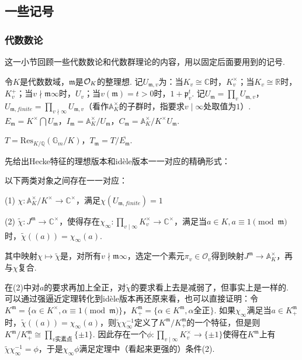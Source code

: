 \subsection{一些记号}

\subsubsection{代数数论}

这一小节回顾一些代数数论和代数群理论的内容，用以固定后面要用到的记号.

令$K$是代数数域，$\mathfrak{m}$是$\mathcal{O}_K$的整理想. 记$U_{\mathfrak{m}, v}$为：当$K_v \cong \mathbb{C}$时，$K_v^{\times}$；当$K_v\cong \mathbb{R}$时，$K_v^{+}$；当$v\nmid\mathfrak{m}\infty$时，$U_{v}$；当$v(\mathfrak{m})=t>0$时，$1+\mathfrak{p}_v^{t}$. 记$U_{\mathfrak{m}}=\prod_v U_{\mathfrak{m}, v}$，$U_{\mathfrak{m}, finite} = \prod_{v\nmid \infty}U_{\mathfrak{m}, v}$（看作$\mathbb{A}_K^{\times}$的子群时，指要求$v\mid \infty$处取值为$1$）. $E_{\mathfrak{m}} = K^{\times} \bigcap U_{\mathfrak{m}}$，$I_{\mathfrak{m}} = \mathbb{A}_K^{\times}/U_{\mathfrak{m}}$，$C_{\mathfrak{m}} = \mathbb{A}_K^{\times} / K^{\times}U_{\mathfrak{m}}$.

$T = \mathrm{Res}_{K/\mathbb{Q}}(\mathbb{G}_m/K)$，$T_{\mathfrak{m}} = T / \overline{E_{\mathfrak{m}}}$.

先给出Hecke特征的理想版本和idèle版本一一对应的精确形式：

\begin{cthm}
    以下两类对象之间存在一一对应：

    (1) $\chi: \mathbb{A}_K^{\times}/K^{\times} \to \mathbb{C}^{\times}$，满足$\chi(U_{\mathfrak{m}, finite}) = 1$

    (2) $\tilde{\chi}: J^{\mathfrak{m}}\to \mathbb{C}^{\times}$，使得存在$\chi_{\infty}:\prod_{v\mid \infty}K_v^{\times} \to \mathbb{C}^{\times}$，满足当$a\in K, a\equiv 1\pmod{\mathfrak{m}}$时，$\tilde{\chi}((a)) = \chi_{\infty}(a)$.

    其中映射$\chi\mapsto \tilde{\chi}$是，对所有$v\nmid \mathfrak{m}\infty$，选定一个素元$\pi_v\in \mathcal{O}_v$得到映射$J^{\mathfrak{m}}\to \mathbb{A}_K^{\times}$，再与$\chi$复合.
\end{cthm}

\begin{crem}
    在(2)中对$a$的要求再加上全正，对$\tilde{\chi}$的要求看上去是减弱了，但事实上是一样的. 可以通过强逼近定理转化到idèle版本再还原来看，也可以直接证明：令$K^{\mathfrak{m}} = \{\alpha\in K^{\times}, \alpha\equiv 1\pmod{\mathfrak{m}}\}$，$K^{\mathfrak{m}}_{+} = \{\alpha\in K^{\mathfrak{m}}, \alpha 全正\}$. 如果$\chi_{\infty}$满足当$a\in K^{\mathfrak{m}}_{+}$时，$\tilde{\chi}((a)) = \chi_{\infty}(a)$，则$\tilde{\chi}\chi_{\infty}^{-1}$定义了$K^{\mathfrak{m}}/K^{\mathfrak{m}}_{+}$的一个特征，但是则$K^{\mathfrak{m}}/K^{\mathfrak{m}}_{+} \cong \prod_{v实素点} \{\pm 1\}$. 因此存在一个$\phi: \prod_{v\mid \infty} K_v^{\times}\to \{\pm 1\}$使得在$K^{\mathfrak{m}}$上有$\tilde{\chi}\chi_{\infty}^{-1} = \phi$，于是$\chi_{\infty}\phi$满足定理中（看起来更强的）条件(2).
\end{crem}


